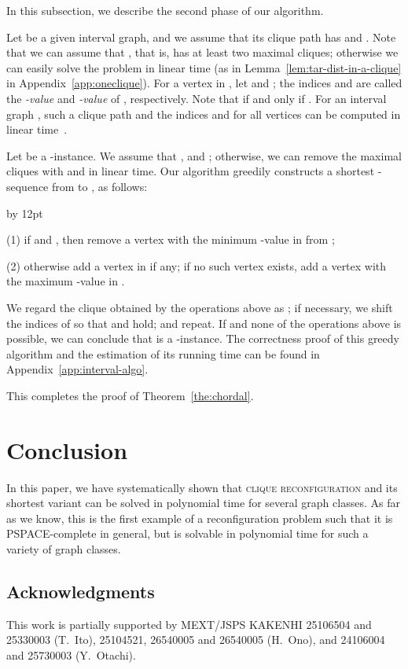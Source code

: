 \documentclass{llncs}
\newenvironment{listing}[1]{\begin{list}{*}{\settowidth{\labelwidth}{#1}\setlength{\leftmargin}{\labelwidth}\advance \leftmargin by 12pt
\setlength{\itemsep}{0pt}\setlength{\parsep}{0pt}\setlength{\topsep}{0pt}\setlength{\parskip}{0pt}}}{\end{list}}
\newcounter{one}
\newcounter{two}
\begin{document}
	In this subsection, we describe the second phase of our algorithm.

Let  be a given interval graph, and we assume that its clique path  has  and . 
	Note that we can assume that , that is,  has at least two maximal cliques;
otherwise we can easily solve the problem in linear time (as in Lemma~\ref{lem:tar-dist-in-a-clique} in Appendix~\ref{app:oneclique}).
	For a vertex  in , let  and ;
the indices  and  are called the \emph{-value} and \emph{-value} of , respectively.
	Note that  if and only if .
	For an interval graph , such a clique path  and the indices  and  for all vertices  can be computed in linear time~\cite{UeharaU07}.

	Let  be a -instance.
	We assume that ,  and ;
otherwise, we can remove the maximal cliques  with  and  in linear time.
	Our algorithm greedily constructs a shortest -sequence from  to , as follows:
	\begin{listing}{aaa}
	\item[(1)] if  and , then remove a vertex with the minimum -value in  from ; 
	\item[(2)] otherwise add a vertex in  if any; 
					if no such vertex exists, add a vertex with the maximum -value in .
	\end{listing}
	We regard the clique obtained by the operations above as ;
if necessary, we shift the indices of  so that  and  hold; and repeat.
	If  and none of the operations above is possible, we can conclude that  is a -instance.
	The correctness proof of this greedy algorithm and the estimation of its running time can be found in Appendix~\ref{app:interval-algo}.

	This completes the proof of Theorem~\ref{the:chordal}. 


	\section{Conclusion}
	In this paper, we have systematically shown that \textsc{clique reconfiguration} and its shortest variant can be solved in polynomial time for several graph classes. 
	As far as we know, this is the first example of a reconfiguration problem such that it is PSPACE-complete in general, but is solvable in polynomial time for such a variety of graph classes.

	\subsection*{Acknowledgments}
	This work is partially supported by MEXT/JSPS KAKENHI 25106504 and 25330003 (T.~Ito), 25104521, 26540005 and 26540005 (H.~Ono), and 24106004 and 25730003 (Y.~Otachi).
\end{document}
